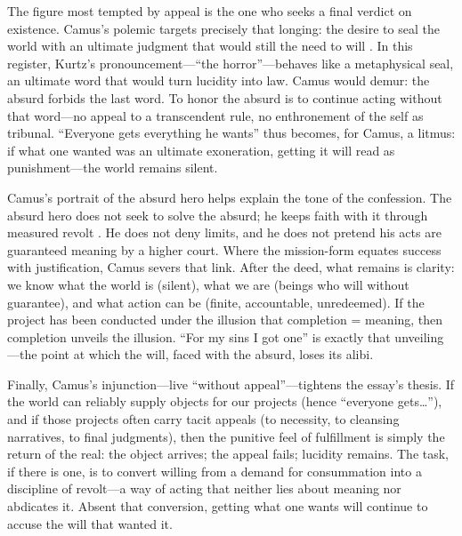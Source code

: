 The figure most tempted by appeal is the one who seeks a final verdict on existence. Camus's
polemic targets precisely that longing: the desire to seal the world with an ultimate judgment
that would still the need to will \parencite[pp.~53--60]{CamusMyth1991}. In this register,
Kurtz's pronouncement—``the horror''—behaves like a metaphysical seal, an ultimate word that
would turn lucidity into law. Camus would demur: the absurd forbids the last word. To honor the
absurd is to continue acting without that word—no appeal to a transcendent rule, no enthronement
of the self as tribunal. ``Everyone gets everything he wants'' thus becomes, for Camus, a
litmus: if what one wanted was an ultimate exoneration, getting it will read as punishment—the
world remains silent.

Camus's portrait of the absurd hero helps explain the tone of the confession. The absurd hero
does not seek to solve the absurd; he keeps faith with it through measured revolt
\parencite[pp.~54--60, 121--123]{CamusMyth1991}. He does not deny limits, and he does not
pretend his acts are guaranteed meaning by a higher court. Where the mission-form equates
success with justification, Camus severs that link. After the deed, what remains is clarity:
we know what the world is (silent), what we are (beings who will without guarantee), and what
action can be (finite, accountable, unredeemed). If the project has been conducted under the
illusion that completion = meaning, then completion unveils the illusion. ``For my sins I got
one'' is exactly that unveiling—the point at which the will, faced with the absurd, loses its
alibi.

Finally, Camus's injunction—live ``without appeal''—tightens the essay's thesis. If the world
can reliably supply objects for our projects (hence ``everyone gets\ldots''), and if those
projects often carry tacit appeals (to necessity, to cleansing narratives, to final judgments),
then the punitive feel of fulfillment is simply the return of the real: the object arrives; the
appeal fails; lucidity remains. The task, if there is one, is to convert willing from a demand
for consummation into a discipline of revolt—a way of acting that neither lies about meaning
nor abdicates it. Absent that conversion, getting what one wants will continue to accuse the
will that wanted it.
